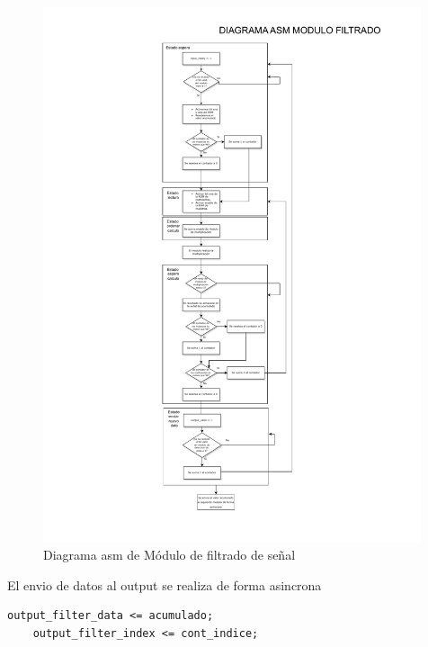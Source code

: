 \begin{figure}[h!]
    \centering
    \includegraphics[width=0.99\textwidth]{./Images/img_implementacion_hw/Diagramaasmfiltrado.pdf}
    \caption{Diagrama asm de Módulo de filtrado de señal}
    \label{fig:Diagramaasmfiltrado}
\end{figure} 

El envio de datos al output se realiza de forma asincrona
\lstset{language=VHDL, breaklines=true, basicstyle=\footnotesize}
\begin{lstlisting}[frame=single]
    output_filter_data <= acumulado;
    output_filter_index <= cont_indice;
\end{lstlisting}

